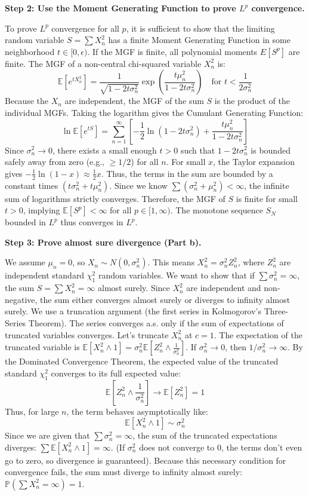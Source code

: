 \begin{solution}
\textbf{Step 2: Use the Moment Generating Function to prove $L^p$ convergence.}

To prove $L^p$ convergence for all $p$, it is sufficient to show that the limiting random variable $S = \sum X_n^2$ has a finite Moment Generating Function in some neighborhood $t \in [0, \epsilon)$. If the MGF is finite, all polynomial moments $E[S^p]$ are finite.
The MGF of a non-central chi-squared variable $X_n^2$ is:
\[ \mathbb{E}[e^{t X_n^2}] = \frac{1}{\sqrt{1-2t\sigma_n^2}} \exp\left(\frac{t\mu_n^2}{1-2t\sigma_n^2}\right) \quad \text{for } t < \frac{1}{2\sigma_n^2} \]
Because the $X_n$ are independent, the MGF of the sum $S$ is the product of the individual MGFs. Taking the logarithm gives the Cumulant Generating Function:
\[ \ln \mathbb{E}[e^{tS}] = \sum_{n=1}^\infty \left[ -\frac{1}{2} \ln(1-2t\sigma_n^2) + \frac{t\mu_n^2}{1-2t\sigma_n^2} \right] \]
Since $\sigma_n^2 \to 0$, there exists a small enough $t > 0$ such that $1-2t\sigma_n^2$ is bounded safely away from zero (e.g., $\ge 1/2$) for all $n$.
For small $x$, the Taylor expansion gives $-\frac{1}{2} \ln(1-x) \approx \frac{1}{2}x$. Thus, the terms in the sum are bounded by a constant times $(t\sigma_n^2 + t\mu_n^2)$.
Since we know $\sum (\sigma_n^2 + \mu_n^2) < \infty$, the infinite sum of logarithms strictly converges. Therefore, the MGF of $S$ is finite for small $t > 0$, implying $\mathbb{E}[S^p] < \infty$ for all $p \in [1, \infty)$. The monotone sequence $S_N$ bounded in $L^p$ thus converges in $L^p$.

\textbf{Step 3: Prove almost sure divergence (Part b).}

We assume $\mu_n = 0$, so $X_n \sim N(0, \sigma_n^2)$. This means $X_n^2 = \sigma_n^2 Z_n^2$, where $Z_n^2$ are independent standard $\chi_1^2$ random variables.
We want to show that if $\sum \sigma_n^2 = \infty$, the sum $S = \sum X_n^2 = \infty$ almost surely.
Since $X_n^2$ are independent and non-negative, the sum either converges almost surely or diverges to infinity almost surely. We use a truncation argument (the first series in Kolmogorov's Three-Series Theorem). The series converges a.s. only if the sum of expectations of truncated variables converges.
Let's truncate $X_n^2$ at $c = 1$. The expectation of the truncated variable is $\mathbb{E}[X_n^2 \wedge 1] = \sigma_n^2 \mathbb{E}\left[ Z_n^2 \wedge \frac{1}{\sigma_n^2} \right]$.
If $\sigma_n^2 \to 0$, then $1/\sigma_n^2 \to \infty$. By the Dominated Convergence Theorem, the expected value of the truncated standard $\chi_1^2$ converges to its full expected value:
\[ \mathbb{E}\left[ Z_n^2 \wedge \frac{1}{\sigma_n^2} \right] \to \mathbb{E}[Z_n^2] = 1 \]
Thus, for large $n$, the term behaves asymptotically like:
\[ \mathbb{E}[X_n^2 \wedge 1] \sim \sigma_n^2 \]
Since we are given that $\sum \sigma_n^2 = \infty$, the sum of the truncated expectations diverges: $\sum \mathbb{E}[X_n^2 \wedge 1] = \infty$.
(If $\sigma_n^2$ does not converge to 0, the terms don't even go to zero, so divergence is guaranteed).
Because this necessary condition for convergence fails, the sum must diverge to infinity almost surely: $\mathbb{P}(\sum X_n^2 = \infty) = 1$.
\end{solution}

